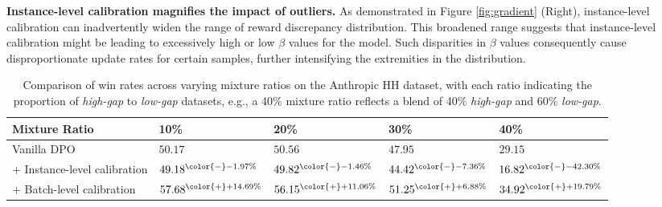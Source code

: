 \textbf{Instance-level calibration magnifies the impact of outliers.}
As demonstrated in Figure \ref{fig:gradient} (Right), instance-level calibration can inadvertently widen the range of reward discrepancy distribution. This broadened range suggests that instance-level calibration might be leading to excessively high or low $\beta$ values for the model. Such disparities in $\beta$ values consequently cause disproportionate update rates for certain samples, further intensifying the extremities in the distribution. 
\begin{table}
    \centering
    \caption{
    Comparison of win rates across varying mixture ratios on the Anthropic HH dataset, with each ratio indicating the proportion of \emph{high-gap} to \emph{low-gap} datasets, e.g., a 40\% mixture ratio reflects a blend of 40\% \emph{high-gap} and 60\% \emph{low-gap}.
    }
    \begin{tabular}{l|l|l|l|l}
        \toprule
        \textbf{Mixture Ratio} & \textbf{10\%} & \textbf{20\%} & \textbf{30\%} & \textbf{40\%}\\
        \midrule
        Vanilla DPO & $50.17$ & $50.56$ & $47.95$ & $29.15$ \\
        + Instance-level calibration & $49.18^{\color{-}- 1.97\%}$ & $49.82^{\color{-}- 1.46\%}$ & $44.42^{\color{-}- 7.36\%}$ & $16.82^{\color{-}- 42.30\%}$ \\
        + Batch-level calibration & $57.68^{\color{+}+ 14.69\%}$ & $56.15^{\color{+}+ 11.06\%}$ & $51.25^{\color{+}+ 6.88\%}$ & $34.92^{\color{+}+ 19.79\%}$ \\
        \bottomrule
    \end{tabular}
    \label{tab:noise}
\end{table}

